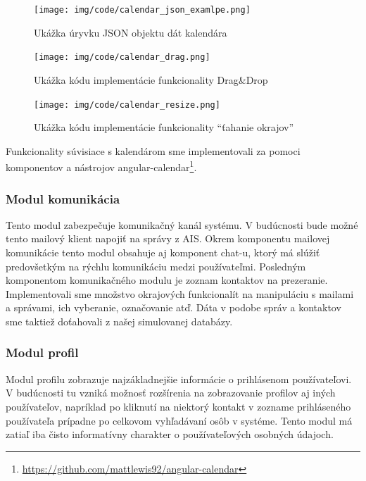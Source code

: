 \begin{figure}[ht]
  \centering
  \texttt{[image: img/code/calendar\_json\_examlpe.png]}
  \caption{\label{fig:calendar_json_examlpe} Ukážka úryvku JSON objektu dát kalendára}
\end{figure}
\newpage

\begin{figure}[ht]
  \centering
  \texttt{[image: img/code/calendar\_drag.png]}
  \caption{\label{fig:calendar_drag} Ukážka kódu implementácie funkcionality Drag\&Drop}
\end{figure}

\begin{figure}[ht]
  \centering
  \texttt{[image: img/code/calendar\_resize.png]}
  \caption{\label{fig:calendar_resize} Ukážka kódu implementácie funkcionality ``ťahanie okrajov''}
\end{figure}

Funkcionality súvisiace s kalendárom sme implementovali za pomoci komponentov a nástrojov
angular-calendar\footnote{\url{https://github.com/mattlewis92/angular-calendar}}.

\subsubsection{Modul komunikácia}
\label{subsubsec:communication_module}

Tento modul zabezpečuje komunikačný kanál systému. V budúcnosti bude možné
tento mailový klient napojiť na správy z AIS. Okrem komponentu mailovej komunikácie
tento modul obsahuje aj komponent chat-u, ktorý má slúžiť predovšetkým na rýchlu
komunikáciu medzi používateľmi. Posledným komponentom komunikačného modulu
je zoznam kontaktov na prezeranie. Implementovali sme množstvo okrajových
funkcionalít na manipuláciu s mailami a správami, ich vyberanie, označovanie atď.
Dáta v podobe správ a kontaktov sme taktiež doťahovali z našej simulovanej databázy. 

\subsubsection{Modul profil}
\label{subsubsec:profile_module}

Modul profilu zobrazuje najzákladnejšie informácie o prihlásenom používateľovi. V budúcnosti
tu vzniká možnosť rozšírenia na zobrazovanie profilov aj iných používateľov, napríklad po kliknutí
na niektorý kontakt v zozname prihláseného používateľa prípadne po celkovom vyhľadávaní
osôb v systéme. Tento modul má zatiaľ iba čisto informatívny charakter o používateľových osobných údajoch.
